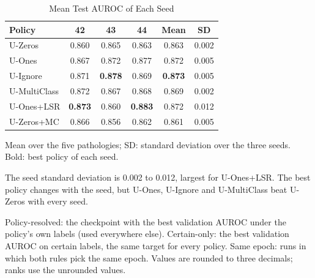 \documentclass[conference]{IEEEtran}
\begin{document}
\begin{table}[!t]
\centering
\caption{Mean Test AUROC of Each Seed}
\label{tab:seeds}
\footnotesize
\begin{tabular}{@{}lccccc@{}}
\toprule
\textbf{Policy} & \textbf{42} & \textbf{43} & \textbf{44} & \textbf{Mean} & \textbf{SD} \\
\midrule
U-Zeros & 0.860 & 0.865 & 0.863 & 0.863 & 0.002 \\
U-Ones & 0.867 & 0.872 & 0.877 & 0.872 & 0.005 \\
U-Ignore & 0.871 & \textbf{0.878} & 0.869 & \textbf{0.873} & 0.005 \\
U-MultiClass & 0.872 & 0.867 & 0.868 & 0.869 & 0.002 \\
U-Ones+LSR & \textbf{0.873} & 0.860 & \textbf{0.883} & 0.872 & 0.012 \\
U-Zeros+MC & 0.866 & 0.856 & 0.862 & 0.861 & 0.005 \\
\bottomrule
\end{tabular}
\par\smallskip
\parbox{\columnwidth}{\footnotesize Mean over the five pathologies; SD: standard deviation over the three seeds. Bold: best policy of each seed.}
\end{table}

The seed standard deviation is 0.002 to 0.012, largest for U-Ones+LSR. The best policy changes with the seed, but U-Ones, U-Ignore and U-MultiClass beat U-Zeros with every seed.

\begin{table}[!t]
\centering
\caption{Mean Test AUROC Under Two Checkpoint Rules}
\label{tab:selection}
\footnotesize
{}
\par\smallskip
\parbox{\columnwidth}{\footnotesize Policy-resolved: the checkpoint with the best validation AUROC under the policy's own labels (used everywhere else). Certain-only: the best validation AUROC on certain labels, the same target for every policy. Same epoch: runs in which both rules pick the same epoch. Values are rounded to three decimals; ranks use the unrounded values.}
\end{table}
\end{document}
